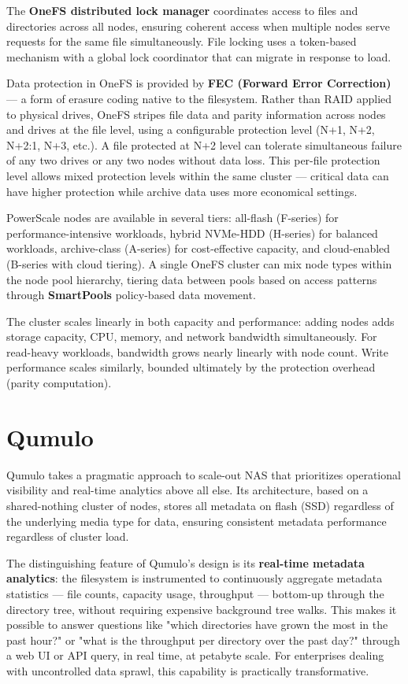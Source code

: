 The \textbf{OneFS distributed lock manager} coordinates access to files and directories across all nodes, ensuring coherent access when multiple nodes serve requests for the same file simultaneously. File locking uses a token-based mechanism with a global lock coordinator that can migrate in response to load.

Data protection in OneFS is provided by \textbf{FEC (Forward Error Correction)} --- a form of erasure coding native to the filesystem. Rather than RAID applied to physical drives, OneFS stripes file data and parity information across nodes and drives at the file level, using a configurable protection level (N+1, N+2, N+2:1, N+3, etc.). A file protected at N+2 level can tolerate simultaneous failure of any two drives or any two nodes without data loss. This per-file protection level allows mixed protection levels within the same cluster --- critical data can have higher protection while archive data uses more economical settings.

PowerScale nodes are available in several tiers: all-flash (F-series) for performance-intensive workloads, hybrid NVMe-HDD (H-series) for balanced workloads, archive-class (A-series) for cost-effective capacity, and cloud-enabled (B-series with cloud tiering). A single OneFS cluster can mix node types within the node pool hierarchy, tiering data between pools based on access patterns through \textbf{SmartPools} policy-based data movement.

The cluster scales linearly in both capacity and performance: adding nodes adds storage capacity, CPU, memory, and network bandwidth simultaneously. For read-heavy workloads, bandwidth grows nearly linearly with node count. Write performance scales similarly, bounded ultimately by the protection overhead (parity computation).

\section{Qumulo}
Qumulo takes a pragmatic approach to scale-out NAS that prioritizes operational visibility and real-time analytics above all else. Its architecture, based on a shared-nothing cluster of nodes, stores all metadata on flash (SSD) regardless of the underlying media type for data, ensuring consistent metadata performance regardless of cluster load.

The distinguishing feature of Qumulo's design is its \textbf{real-time metadata analytics}: the filesystem is instrumented to continuously aggregate metadata statistics --- file counts, capacity usage, throughput --- bottom-up through the directory tree, without requiring expensive background tree walks. This makes it possible to answer questions like "which directories have grown the most in the past hour?" or "what is the throughput per directory over the past day?" through a web UI or API query, in real time, at petabyte scale. For enterprises dealing with uncontrolled data sprawl, this capability is practically transformative.

